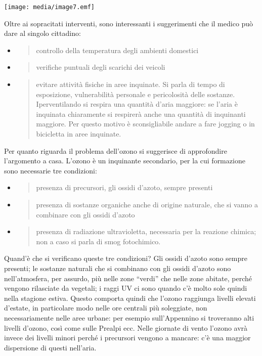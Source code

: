 \documentclass[]{article}
\begin{document}
\texttt{[image: media/image7.emf]}

Oltre ai sopracitati interventi, sono interessanti i suggerimenti che il
medico può dare al singolo cittadino:

\begin{itemize}
\item
  \begin{quote}
  controllo della temperatura degli ambienti domestici
  \end{quote}
\item
  \begin{quote}
  verifiche puntuali degli scarichi dei veicoli
  \end{quote}
\item
  \begin{quote}
  evitare attività fisiche in aree inquinate. Si parla di tempo di
  esposizione, vulnerabilità personale e pericolosità delle sostanze.
  Iperventilando si respira una quantità d'aria maggiore: se l'aria è
  inquinata chiaramente si respirerà anche una quantità di inquinanti
  maggiore. Per questo motivo è sconsigliabile andare a fare jogging o
  in bicicletta in aree inquinate.
  \end{quote}
\end{itemize}

Per quanto riguarda il problema dell'ozono si suggerisce di approfondire
l'argomento a casa. L'ozono è un inquinante secondario, per la cui
formazione sono necessarie tre condizioni:

\begin{itemize}
\item
  \begin{quote}
  presenza di precursori, gli ossidi d'azoto, sempre presenti
  \end{quote}
\item
  \begin{quote}
  presenza di sostanze organiche anche di origine naturale, che si vanno
  a combinare con gli ossidi d'azoto
  \end{quote}
\item
  \begin{quote}
  presenza di radiazione ultravioletta, necessaria per la reazione
  chimica; non a caso si parla di smog fotochimico.
  \end{quote}
\end{itemize}

Quand'è che si verificano queste tre condizioni? Gli ossidi d'azoto sono
sempre presenti; le sostanze naturali che si combinano con gli ossidi
d'azoto sono nell'atmosfera, per assurdo, più nelle zone ``verdi'' che
nelle zone abitate, perché vengono rilasciate da vegetali; i raggi UV ci
sono quando c'è molto sole quindi nella stagione estiva. Questo comporta
quindi che l'ozono raggiunga livelli elevati d'estate, in particolare
modo nelle ore centrali più soleggiate, non necessariamente nelle aree
urbane: per esempio sull'Appennino si troveranno alti livelli d'ozono,
così come sulle Prealpi ecc. Nelle giornate di vento l'ozono avrà invece
dei livelli minori perché i precursori vengono a mancare: c'è una
maggior dispersione di questi nell'aria.
\end{document}
